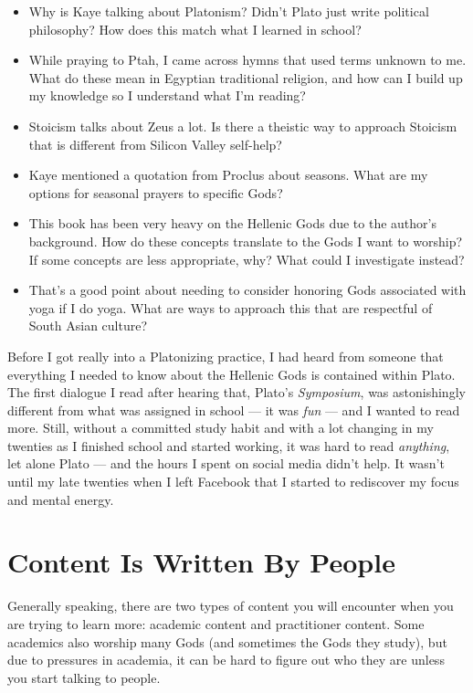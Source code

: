 \documentclass[
]{book}
\providecommand{\tightlist}{%
  \setlength{\itemsep}{0pt}\setlength{\parskip}{0pt}}
\begin{document}
\begin{itemize}
\tightlist
\item
  Why is Kaye talking about Platonism? Didn't Plato just write political philosophy? How does this match what I learned in school?
\item
  While praying to Ptah, I came across hymns that used terms unknown to me. What do these mean in Egyptian traditional religion, and how can I build up my knowledge so I understand what I'm reading?
\item
  Stoicism talks about Zeus a lot. Is there a theistic way to approach Stoicism that is different from Silicon Valley self-help?
\item
  Kaye mentioned a quotation from Proclus about seasons. What are my options for seasonal prayers to specific Gods?
\item
  This book has been very heavy on the Hellenic Gods due to the author's background. How do these concepts translate to the Gods I want to worship? If some concepts are less appropriate, why? What could I investigate instead?
\item
  That's a good point about needing to consider honoring Gods associated with yoga if I do yoga. What are ways to approach this that are respectful of South Asian culture?
\end{itemize}

Before I got really into a Platonizing practice, I had heard from someone that everything I needed to know about the Hellenic Gods is contained within Plato. The first dialogue I read after hearing that, Plato's \emph{Symposium}, was astonishingly different from what was assigned in school --- it was \emph{fun} --- and I wanted to read more. Still, without a committed study habit and with a lot changing in my twenties as I finished school and started working, it was hard to read \emph{anything}, let alone Plato --- and the hours I spent on social media didn't help. It wasn't until my late twenties when I left Facebook that I started to rediscover my focus and mental energy.

\hypertarget{content-is-written-by-people}{%
\section{Content Is Written By People}\label{content-is-written-by-people}}

Generally speaking, there are two types of content you will encounter when you are trying to learn more: academic content and practitioner content. Some academics also worship many Gods (and sometimes the Gods they study), but due to pressures in academia, it can be hard to figure out who they are unless you start talking to people.
\end{document}
